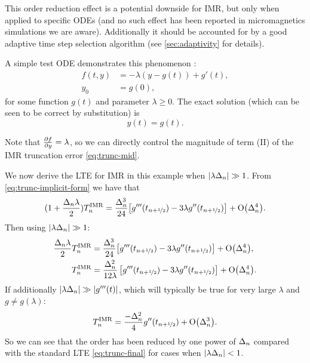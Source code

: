 This order reduction effect is a potential downside for IMR, but only when applied to specific ODEs (and no such effect has been reported in micromagnetics simulations we are aware).
Additionally it should be accounted for by a good adaptive time step selection algorithm (see \cref{sec:adaptivity} for details).

A simple test ODE demonstrates this phenomenon \cite[157]{Atkinson2009}:
\begin{equation}
  \begin{aligned}
    \label{eqn:imr-test-order-reduction}
    f(t, y) &= -\lambda (y - g(t)) + g'(t), \\
    y_0 &= g(0),
  \end{aligned}
\end{equation}
for some function $g(t)$ and parameter $\lambda \geq 0$.
The exact solution (which can be seen to be correct by substitution) is
\begin{equation}
  y(t) = g(t).
\end{equation}

Note that $\frac{\partial f}{\partial y} = \lambda$, so we can directly control the magnitude of term (II) of the IMR truncation error \eqref{eq:trunc-mid}.

We now derive the LTE for IMR in this example when $\left|{\lambda\Delta_{n}} \right| \gg 1$.
From \cref{eq:trunc-implicit-form} we have that
\begin{equation}
  \begin{aligned}
    (1 + \frac{\Delta_{n} \lambda}{2})T_n^{\mathrm{IMR}} &= \frac{\Delta_{n}^3}{24}
    {\left[ g'''(t_{n+\nicefrac{1}{2}}) - 3 \lambda g''(t_{n+\nicefrac{1}{2}}) \right]} + \mathrm{O}{\left( \Delta_{n}^4 \right)}. \\
  \end{aligned}
\end{equation}
Then using $\left|{\lambda\Delta_{n}} \right| \gg 1$:
\begin{equation}
  \begin{aligned}
    \frac{\Delta_{n} \lambda}{2} T_n^{\mathrm{IMR}} &= \frac{\Delta_{n}^3}{24}
    {\left[ g'''(t_{n+\nicefrac{1}{2}}) - 3 \lambda g''(t_{n+\nicefrac{1}{2}}) \right]} + \mathrm{O}{\left( \Delta_{n}^4 \right)}, \\
    T_n^{\mathrm{IMR}} &= \frac{\Delta_{n}^2}{12\lambda} \left[g'''(t_{n+\nicefrac{1}{2}}) - 3 \lambda g''(t_{n+\nicefrac{1}{2}}) \right] + \mathrm{O}{\left( \Delta_{n}^4 \right)}. \\
  \end{aligned}
\end{equation}
If additionally $\left|{\lambda\Delta_{n}} \right| \gg \left|{g'''(t)} \right|$, which will typically be true for very large $\lambda$ and $g \neq g(\lambda)$:
\begin{equation}
  T_n^{\mathrm{IMR}} = \frac{-\Delta_{n}^2}{4} g''(t_{n+\nicefrac{1}{2}}) + \mathrm{O}{\left( \Delta_{n}^3 \right)}.
  \label{eq:reduced-order-imr-truncation-error}
\end{equation}
So we can see that the order has been reduced by one power of $\Delta_{n}$ compared with the standard LTE \cref{eq:trunc-final} for cases when $\left|{\lambda\Delta_{n}} \right| < 1$.


